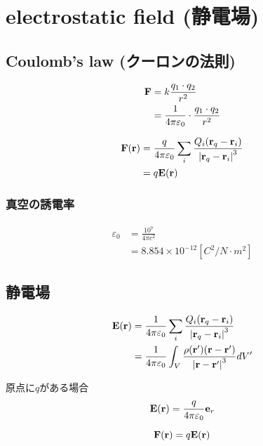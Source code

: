 \section{electrostatic field (静電場)}


\subsection{Coulomb's law (クーロンの法則)}
\begin{align}
  {\bf F}
      & = k \frac{q_1 \cdot q_2}{r^2} \\
      & = \frac{1}{4\pi \varepsilon_0 } \cdot \frac{q_1 \cdot q_2}{r^2}
\end{align}

\begin{align}
  {\bf F} ( {\bf r} )
      & = \frac{q}{4\pi \varepsilon_0} \sum_{i} \frac{Q_i ( {\bf r}_q - {\bf r}_i )}{ {| {\bf r}_q - {\bf r}_i |}^3 } \\
      & = q{\bf E} ({\bf r})
\end{align}


\subsubsection{真空の誘電率}
\begin{align}
  \varepsilon_0
      & = \frac{10^7}{4\pi c^2} \\
      & = 8.854\times 10^{-12} [C^2/N\cdot m^2]
\end{align}


\subsection{静電場}
\begin{align}
  {\bf E} ( {\bf r} )
      & = \frac{1}{4\pi \varepsilon_0} \sum_{i} \frac{Q_i ( {\bf r}_q - {\bf r}_i )}{ {| {\bf r}_q - {\bf r}_i |}^3 } \\
      & = \frac{1}{4\pi \varepsilon_0} \int_V \frac{\rho ({\bf r'}) ( {\bf r} - {\bf r'} )}{ {| {\bf r} - {\bf r'} |}^3 } dV'
\end{align}

原点に$q$がある場合
\begin{equation}
  {\bf E} ({\bf r}) = \frac{q}{4\pi \varepsilon_0} {\bf e}_r
\end{equation}

\begin{equation}
  {\bf F}( {\bf r}) = q {\bf E} ( {\bf r})
\end{equation}


